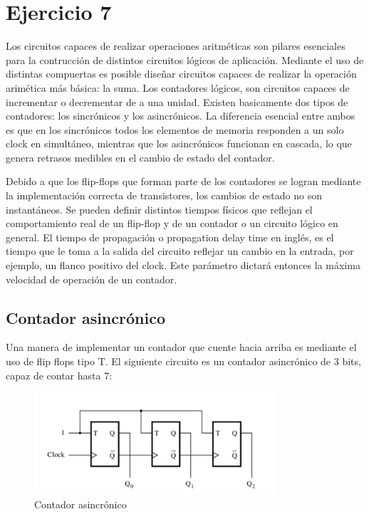 \section{Ejercicio 7}
Los circuitos capaces de realizar operaciones aritméticas son pilares esenciales para la contrucción de distintos circuitos lógicos de aplicación. Mediante el uso de distintas compuertas es posible diseñar circuitos capaces de realizar la operación arimética más básica: la suma. Los contadores lógicos, son circuitos capaces de incrementar o decrementar de a una unidad. Existen basicamente dos tipos de contadores: los sincrónicos y los asincrónicos. La diferencia esencial entre ambos es que en los sincrónicos todos los elementos de memoria responden a un solo clock en simultáneo, mientras que los asincrónicos funcionan en cascada, lo que genera retrasos medibles en el cambio de estado del contador. 


Debido a que los flip-flops que forman parte de los contadores se logran mediante la implementación correcta de transistores, los cambios de estado no son instantáneos. Se pueden definir distintos tiempos físicos que reflejan el comportamiento real de un flip-flop y de un contador o un circuito lógico en general. El tiempo de propagación o propagation delay time en inglés, es el tiempo que le toma a la salida del circuito reflejar un cambio en la entrada, por ejemplo, un flanco positivo del clock. Este par\'ametro dictar\'a entonces la m\'axima velocidad de operaci\'on de un contador. 

\subsection{Contador asincrónico} 

Una manera de implementar un contador que cuente hacia arriba es mediante el uso de flip flops tipo T. El siguiente circuito es un contador asincrónico de 3 bits, capaz de contar hasta 7:

\begin{figure}[H]
	\centering
	\includegraphics[width=0.8\textwidth]{Ejercicio7/Recursos/asincronico}
	\caption{Contador asincrónico}
\end{figure}


